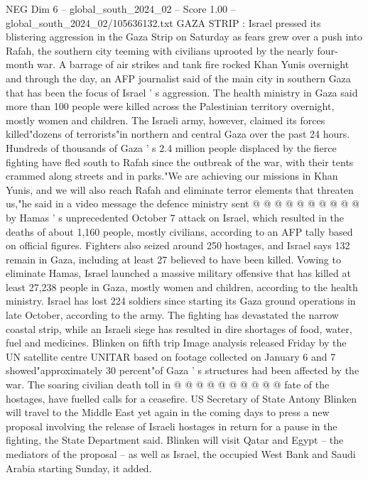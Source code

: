 \begin{textsample}{NEG Dim 6 – global\_south\_2024\_02 – Score 1.00 – global\_south\_2024\_02/105636132.txt}  \label{ex:f6_neg_281}
GAZA STRIP : Israel pressed its blistering aggression in the Gaza Strip on Saturday as fears grew over a push into Rafah, the southern city teeming with civilians uprooted by the nearly four-month war.
A barrage of air strikes and tank fire rocked Khan Yunis overnight and through the day, an AFP journalist said of the main city in southern Gaza that has been the focus of Israel ' s aggression.
The health ministry in Gaza said more than 100 people were killed across the Palestinian territory overnight, mostly women and children.
The Israeli army, however, claimed its forces killed"dozens of terrorists"in northern and central Gaza over the past 24 hours.
Hundreds of thousands of Gaza ' s 2.4 million people displaced by the fierce fighting have fled south to Rafah since the outbreak of the war, with their tents crammed along streets and in parks."We are achieving our missions in Khan Yunis, and we will also reach Rafah and eliminate terror elements that threaten us,"he said in a video message the defence ministry sent @ @ @ @ @ @ @ @ @ @ by Hamas ' s unprecedented October 7 attack on Israel, which resulted in the deaths of about 1,160 people, mostly civilians, according to an AFP tally based on official figures.
Fighters also seized around 250 hostages, and Israel says 132 remain in Gaza, including at least 27 believed to have been killed.
Vowing to eliminate Hamas, Israel launched a massive military offensive that has killed at least 27,238 people in Gaza, mostly women and children, according to the health ministry.
Israel has lost 224 soldiers since starting its Gaza ground operations in late October, according to the army.
The fighting has devastated the narrow coastal strip, while an Israeli siege has resulted in dire shortages of food, water, fuel and medicines.
Blinken on fifth trip Image analysis released Friday by the UN satellite centre UNITAR based on footage collected on January 6 and 7 showed"approximately 30 percent"of Gaza ' s structures had been affected by the war.
The soaring civilian death toll in @ @ @ @ @ @ @ @ @ @ fate of the hostages, have fuelled calls for a ceasefire.
US Secretary of State Antony Blinken will travel to the Middle East yet again in the coming days to press a new proposal involving the release of Israeli hostages in return for a pause in the fighting, the State Department said.
Blinken will visit Qatar and Egypt -- the mediators of the proposal -- as well as Israel, the occupied West Bank and Saudi Arabia starting Sunday, it added.

\end{textsample}
